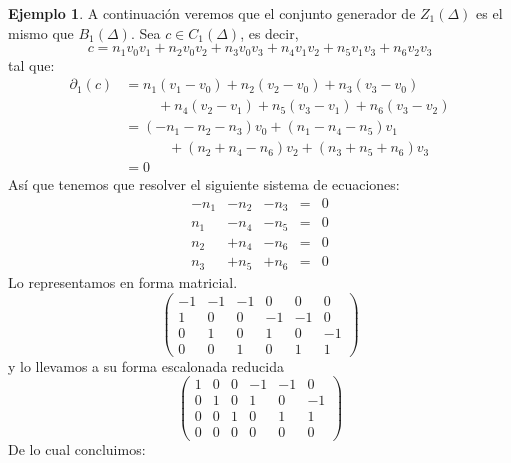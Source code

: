 \documentclass[12pt]{book}
\theoremstyle{definition}
\newtheorem{example}[theorem]{Ejemplo}
\newcounter{in}
\begin{document}
\begin{example}
  A continuación veremos que el conjunto generador de $Z_{1}(\Delta)$
  es el mismo que $B_{1}(\Delta)$. Sea $c\in C_{1}(\Delta)$, es decir,
 $$c=n_{1}v_{0}v_{1}+n_{2}v_{0}v_{2}+n_{3}v_{0}v_{3}+n_{4}v_{1}v_{2}+n_{5}v_{1}v_{3}+n_{6}v_{2}v_{3}$$
 tal que:
 \begin{align*}
   \partial_{1}(c)&=n_{1}(v_{1}-v_{0})+n_{2}(v_{2}-v_{0})+n_{3}(v_{3}-v_{0})\\
   &\phantom{{}=n_{1}}+n_{4}(v_{2}-v_{1})+n_{5}(v_{3}-v_{1})+n_{6}(v_{3}-v_{2})\\
   &=(-n_{1}-n_{2}-n_{3})v_{0}+(n_{1}-n_{4}-n_{5})v_{1}\\
   &\phantom{{}=-n_{1}}+(n_{2}+n_{4}-n_{6})v_{2}+(n_{3}+n_{5}+n_{6})v_{3}\\
   &=0
 \end{align*}
 Así que tenemos que resolver el siguiente sistema de ecuaciones:
 \[\begin{array}{rrrrr}
   -n_{1} & -n_{2} & -n_{3} & = & 0 \\
   n_{1} & -n_{4} & -n_{5} & = & 0 \\
   n_{2} & +n_{4} & -n_{6} & = & 0 \\
   n_{3} & +n_{5} & +n_{6} & = & 0 
 \end{array}\]
 Lo representamos en forma matricial.
 \[ \left(
   \begin{array}{rrrrrr}
     -1  & -1    & -1   & 0    & 0     & 0 \\
     1   & 0     &    0 & -1   & -1    & 0 \\
     0   & 1     &    0 & 1   & 0    & -1 \\
     0   & 0     &    1 & 0   & 1    & 1 
   \end{array} 
 \right)\]
 y lo llevamos a su forma escalonada reducida
 \[ \left(
   \begin{array}{rrrrrr}
     1     &    0  & 0     & -1    & -1    & 0 \\
     0     &    1  & 0     &  1    & 0     & -1 \\
     0     &    0  & 1     & 0     & 1     & 1 \\
     0     &    0  & 0     & 0     & 0     & 0 
   \end{array} 
 \right)\]
 De lo cual concluimos:
 \[\begin{array}{rrrrr}

\end{array}\]
\end{example}
\end{document}
